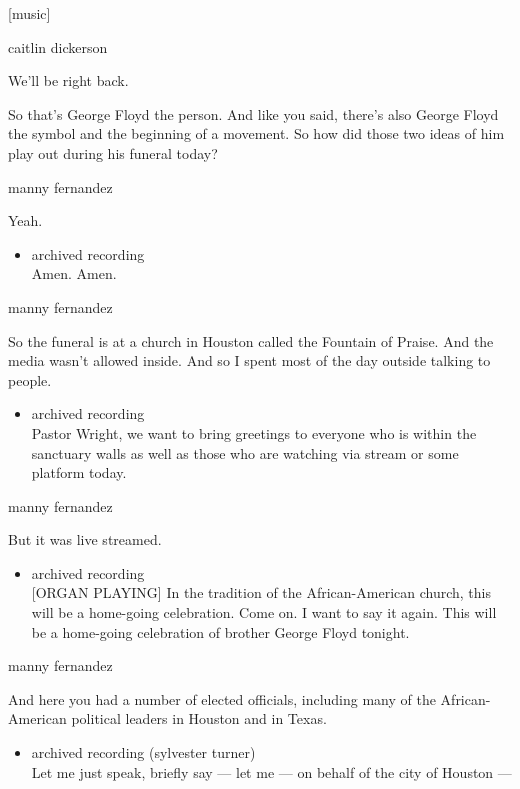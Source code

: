 {[}music{]}

caitlin dickerson

We'll be right back.

So that's George Floyd the person. And like you said, there's also
George Floyd the symbol and the beginning of a movement. So how did
those two ideas of him play out during his funeral today?

manny fernandez

Yeah.

\begin{itemize}
\tightlist
\item
  archived recording\\
  Amen. Amen.
\end{itemize}

manny fernandez

So the funeral is at a church in Houston called the Fountain of Praise.
And the media wasn't allowed inside. And so I spent most of the day
outside talking to people.

\begin{itemize}
\tightlist
\item
  archived recording\\
  Pastor Wright, we want to bring greetings to everyone who is within
  the sanctuary walls as well as those who are watching via stream or
  some platform today.
\end{itemize}

manny fernandez

But it was live streamed.

\begin{itemize}
\tightlist
\item
  archived recording\\
  {[}ORGAN PLAYING{]} In the tradition of the African-American church,
  this will be a home-going celebration. Come on. I want to say it
  again. This will be a home-going celebration of brother George Floyd
  tonight.
\end{itemize}

manny fernandez

And here you had a number of elected officials, including many of the
African-American political leaders in Houston and in Texas.

\begin{itemize}
\tightlist
\item
  archived recording (sylvester turner)\\
  Let me just speak, briefly say --- let me --- on behalf of the city of
  Houston ---
\end{itemize}

